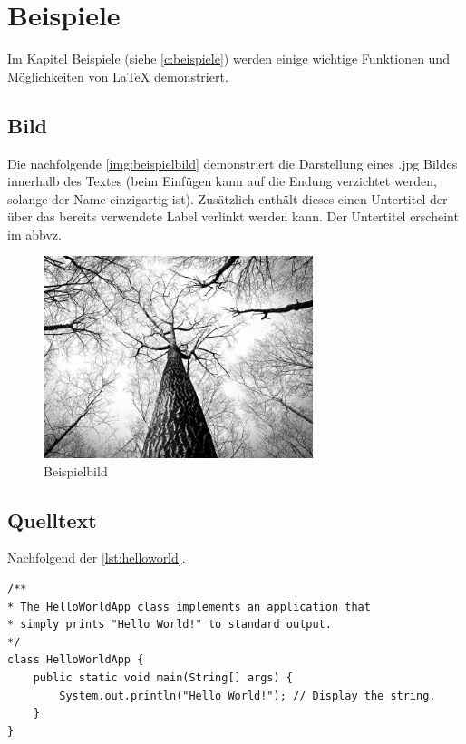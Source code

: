 \chapter{Beispiele} \label{c:beispiele}

Im Kapitel Beispiele (siehe \autoref{c:beispiele}) werden einige wichtige Funktionen und Möglichkeiten von LaTeX demonstriert.

\section{Bild}

Die nachfolgende \autoref{img:beispielbild} demonstriert die Darstellung eines \glqq *.jpg\grqq{} Bildes innerhalb des Textes (beim Einfügen kann auf die Endung verzichtet werden, solange der Name einzigartig ist). Zusätzlich enthält dieses einen Untertitel der über das bereits verwendete Label verlinkt werden kann. Der Untertitel erscheint im \gls{abbvz}.

\begin{figure}[h]
	\centering
	\includegraphics[width=0.7\textwidth]{resources/example}
	\caption{Beispielbild {\cite{PEXELS2015}}}
	\label{img:beispielbild}
\end{figure}

\section{Quelltext}

Nachfolgend der \autoref{lst:helloworld}.

\begin{lstlisting}[caption={Hello World}, captionpos=b, label={lst:helloworld}]
/**
* The HelloWorldApp class implements an application that
* simply prints "Hello World!" to standard output.
*/
class HelloWorldApp {
	public static void main(String[] args) {
		System.out.println("Hello World!"); // Display the string.
	}
}
\end{lstlisting}

